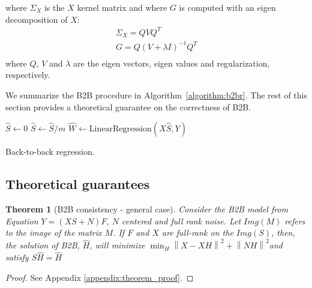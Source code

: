 \documentclass[preprint,12pt,3p]{elsarticle}
\newtheorem{theorem}{Theorem}
\begin{document}
where $\Sigma_X$ is the $X$ kernel matrix and where $G$ is computed with an
eigen decomposition of $X$:
\begin{equation}
  \begin{aligned}
  \Sigma_X = Q V Q^T \\
  G = Q (V + \lambda I)^{-1} Q^T\\
  \end{aligned}
\end{equation}
where $Q$, $V$ and $\lambda$ are the eigen vectors, eigen values and
regularization, respectively.

We summarize the B2B procedure in Algorithm~\ref{algorithm:b2br}.
%
The rest of this section provides a theoretical guarantee on the correctness of
B2B.


\begin{algorithm}[H]
    $\hat{S} \leftarrow 0$\;
    $\hat{S} \leftarrow \hat{S} / m$\;
    $\hat{W} \leftarrow \text{LinearRegression}(X \hat{S}, Y)$\;
    \caption{Back-to-back regression.}
    \label{algorithm:b2br}
\end{algorithm}

\subsection{Theoretical guarantees}
\label{sec:theorem}

\begin{theorem}[B2B consistency - general case]

     Consider the B2B model from Equation $Y = (XS + N)F$, $N$ centered and full
     rank noise.
     Let $Img(M)$ refers to the image of the matrix $M$. If $F$ and $X$ are
     full-rank on the $Img(S)$, then, the solution of B2B, $\hat H$, will
     minimize
     $\min_H  \left \| X - XH\right\| ^2  + \left \| NH\right \| ^2$and satisfy $S\hat H = \hat H$
\end{theorem}
%
\begin{proof}
  See Appendix \ref{appendix:theorem_proof}.
\end{proof}
\end{document}
